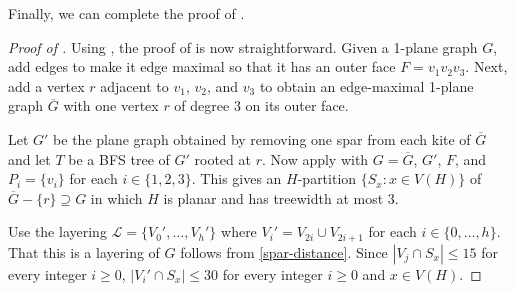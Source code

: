 \documentclass{patmorin}
\begin{document}
Finally, we can complete the proof of .

\begin{proof}[Proof of ]
  Using , the proof of  is now straightforward. Given a 1-plane graph $G$, add edges to make it edge maximal so that it has an outer face $F=v_1v_2v_3$. Next, add a vertex $r$ adjacent to $v_1$, $v_2$, and $v_3$ to obtain an edge-maximal 1-plane graph $\overline{G}$ with one vertex $r$ of degree 3 on its outer face. 
  
  Let $G'$ be the plane graph obtained by removing one spar from each kite of $\overline{G}$ and let $T$ be a BFS tree of $G'$ rooted at $r$.  Now apply  with $G=\overline{G}$, $G'$, $F$, and $P_i=\{v_i\}$ for each $i\in\{1,2,3\}$.  This gives an $H$-partition $\{S_x:x\in V(H)\}$ of $\overline{G}-\{r\}\supseteq G$ in which $H$ is planar and has treewidth at most 3.
  
  Use the layering $\mathcal{L}=\{V_0',\ldots,V_h'\}$ where $V_i'=V_{2i}\cup V_{2i+1}$ for each $i\in\{0,\ldots,h\}$. That this is a layering of $G$ follows from \eqref{spar-distance}.  Since $|V_j\cap S_x|\le 15$ for every integer $i\ge 0$, $|V_i'\cap S_x|\le 30$ for every integer $i\ge 0$ and $x\in V(H)$.
\end{proof}




\end{document}
